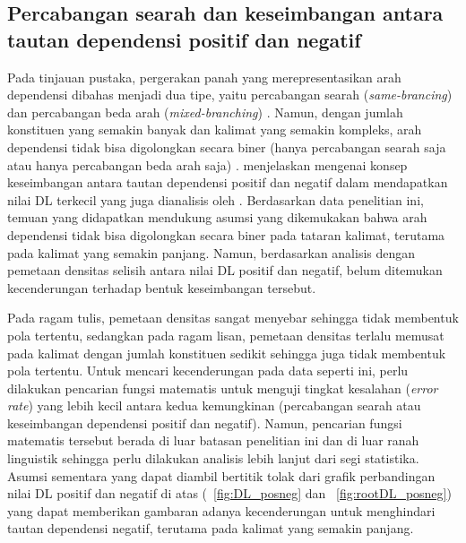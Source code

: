 \subsection{Percabangan searah dan keseimbangan antara tautan dependensi positif dan negatif}
Pada tinjauan pustaka, pergerakan panah yang merepresentasikan arah dependensi dibahas menjadi dua tipe, yaitu percabangan searah (\textit{same-brancing}) dan percabangan beda arah (\textit{mixed-branching}) \citep{hawkins1994performance}. Namun, dengan jumlah konstituen yang semakin banyak dan kalimat yang semakin kompleks, arah dependensi tidak bisa digolongkan secara biner (hanya percabangan searah saja atau hanya percabangan beda arah saja) \citealp{dryer1992greenbergian, temperley2008dependency}. \cite{gildea2010grammars} menjelaskan mengenai konsep keseimbangan antara tautan dependensi positif dan negatif dalam mendapatkan nilai DL terkecil yang juga dianalisis oleh \citep{dryer1992greenbergian}. Berdasarkan data penelitian ini, temuan yang didapatkan mendukung asumsi yang dikemukakan \cite{dryer1992greenbergian} bahwa arah dependensi tidak bisa digolongkan secara biner pada tataran kalimat, terutama pada kalimat yang semakin panjang. Namun, berdasarkan analisis dengan pemetaan densitas selisih antara nilai DL positif dan negatif, belum ditemukan kecenderungan terhadap bentuk keseimbangan tersebut. 

Pada ragam tulis, pemetaan densitas sangat menyebar sehingga tidak membentuk pola tertentu, sedangkan pada ragam lisan, pemetaan densitas terlalu memusat pada kalimat dengan jumlah konstituen sedikit sehingga juga tidak membentuk pola tertentu. Untuk mencari kecenderungan pada data seperti ini, perlu dilakukan pencarian fungsi matematis untuk menguji tingkat kesalahan (\textit{error rate}) yang lebih kecil antara kedua kemungkinan (percabangan searah atau keseimbangan dependensi positif dan negatif). Namun, pencarian fungsi matematis tersebut berada di luar batasan penelitian ini dan di luar ranah linguistik sehingga perlu dilakukan analisis lebih lanjut dari segi statistika. Asumsi sementara yang dapat diambil bertitik tolak dari grafik perbandingan nilai DL positif dan negatif di atas (\pic~\ref{fig:DL_posneg} dan \pic~\ref{fig:rootDL_posneg}) yang dapat memberikan gambaran adanya kecenderungan untuk menghindari tautan dependensi negatif, terutama pada kalimat yang semakin panjang.


